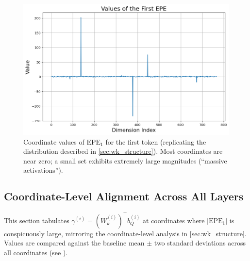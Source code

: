 \documentclass[11pt]{article}
\begin{document}
\begin{figure}[t]
  \includegraphics[width=\columnwidth]{figures/massive_activations_in_ppe.png}
  \caption{Coordinate values of $\mathrm{EPE}_1$ for the first token (replicating the distribution described in \cref{sec:wk_structure}). Most coordinates are near zero; a small set exhibits extremely large magnitudes (``massive activations'').}
  \label{fig:appendix_massive_activations}
\end{figure}

\subsection{Coordinate-Level Alignment Across All Layers} \label{app:coor_align}

This section tabulates $\gamma^{(i)}=(W_k^{(i)})^\top b_Q^{(i)}$ at coordinates where $|\mathrm{EPE}_1|$ is conspicuously large, mirroring the coordinate-level analysis in \cref{sec:wk_structure}. Values are compared against the baseline mean $\pm$ two standard deviations across all coordinates (see ).
\end{document}
